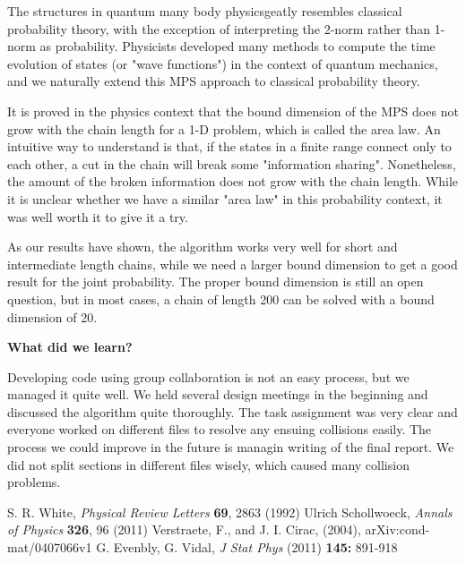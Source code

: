 \documentclass[english]{article}[12pt]
\begin{document}
The structures in quantum many body physicsgeatly  resembles classical probability theory, with the exception of interpreting the 2-norm rather than 1-norm as probability. Physicists developed many methods to compute the time evolution of states (or "wave functions") in the context of quantum mechanics, and we naturally extend this MPS approach to classical probability theory.

It is proved in the physics context that the bound dimension of the MPS does not grow with the chain length for a 1-D problem, which is called the area law. An intuitive way to understand is that, if the states in a finite range connect only to each other, a cut in the chain will break some "information sharing". Nonetheless, the amount of the broken information does not grow with the chain length. While it is unclear whether we have a similar "area law" in this probability context, it was well worth it to give it a try.

As our results have shown, the algorithm works very well for short and intermediate length chains, while we need a larger bound dimension to get a good result for the joint probability. The proper bound dimension is still an open question, but in most cases, a chain of length 200 can be solved with a bound dimension of 20.

\noindent \textbf{What did we learn?}

Developing code using group collaboration is not an easy process, but we managed it quite well. We held several design meetings in the beginning and discussed the algorithm quite thoroughly. The task assignment was very clear and everyone worked on different files to resolve any ensuing collisions easily. The process we could improve in the future is managin writing of the final report. We did not split sections in different files wisely, which caused many collision problems.
\newpage
\begin{thebibliography}{99}
 S. R. White, {\it Physical Review Letters} {\bf 69}, 2863 (1992)
 Ulrich Schollwoeck, {\it Annals of Physics} {\bf 326}, 96 (2011)
 Verstraete, F., and J. I. Cirac, (2004), arXiv:cond-mat/0407066v1
G. Evenbly, G. Vidal, {\it J Stat Phys} (2011) {\bf 145:} 891-918
\end{thebibliography}
\end{document}
